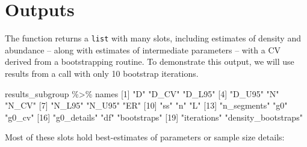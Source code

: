 \documentclass[
]{book}
\newenvironment{Shaded}{\begin{snugshade}}{\end{snugshade}}
\newcommand{\DecValTok}[1]{\textcolor[rgb]{0.00,0.00,0.81}{#1}}
\newcommand{\NormalTok}[1]{#1}
\newcommand{\SpecialCharTok}[1]{\textcolor[rgb]{0.00,0.00,0.00}{#1}}
\newcommand{\StringTok}[1]{\textcolor[rgb]{0.31,0.60,0.02}{#1}}
\begin{document}
\hypertarget{outputs-1}{%
\section*{Outputs}\label{outputs-1}}

The function returns a \texttt{list} with many slots, including estimates of density and abundance -- along with estimates of intermediate parameters -- with a CV derived from a bootstrapping routine. To demonstrate this output, we will use results from a call with only 10 bootstrap iterations.

\begin{Shaded}
\begin{Highlighting}[]
\NormalTok{results\_subgroup }\SpecialCharTok{\%\textgreater{}\%}\NormalTok{ names}
\NormalTok{ [}\DecValTok{1}\NormalTok{] }\StringTok{"D"}                  \StringTok{"D\_CV"}               \StringTok{"D\_L95"}             
\NormalTok{ [}\DecValTok{4}\NormalTok{] }\StringTok{"D\_U95"}              \StringTok{"N"}                  \StringTok{"N\_CV"}              
\NormalTok{ [}\DecValTok{7}\NormalTok{] }\StringTok{"N\_L95"}              \StringTok{"N\_U95"}              \StringTok{"ER"}                
\NormalTok{[}\DecValTok{10}\NormalTok{] }\StringTok{"ss"}                 \StringTok{"n"}                  \StringTok{"L"}                 
\NormalTok{[}\DecValTok{13}\NormalTok{] }\StringTok{"n\_segments"}         \StringTok{"g0"}                 \StringTok{"g0\_cv"}             
\NormalTok{[}\DecValTok{16}\NormalTok{] }\StringTok{"g0\_details"}         \StringTok{"df"}                 \StringTok{"bootstraps"}        
\NormalTok{[}\DecValTok{19}\NormalTok{] }\StringTok{"iterations"}         \StringTok{"density\_bootstraps"}
\end{Highlighting}
\end{Shaded}

Most of these slots hold best-estimates of parameters or sample size details:
\end{document}

